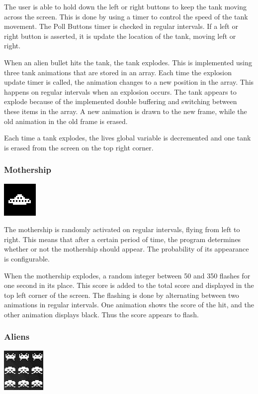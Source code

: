\documentclass[11pt,letter,oneside]{report}
\begin{document}
The user is able to hold down the left or right buttons to keep the tank moving across the screen. This is done by using a timer to control the speed of the tank movement. The Poll Buttons timer is checked in regular intervals. If a left or right button is asserted, it is update the location of the tank, moving left or right.

When an alien bullet hits the tank, the tank explodes. This is implemented using three tank animations that are stored in an array. Each time the explosion update timer is called, the animation changes to a new position in the array. This happens on regular intervals when an explosion occurs. The tank appears to explode because of the implemented double buffering and switching between these items in the array. A new animation is drawn to the new frame, while the old animation in the old frame is erased.

Each time a tank explodes, the lives global variable is decremented and one tank is erased from the screen on the top right corner.

\subsubsection{Mothership}
\includegraphics[]{big-alien.png}

The mothership is randomly activated on regular intervals, flying from left to right. This means that after a certain period of time, the program determines whether or not the mothership should appear. The probability of its appearance is configurable.

When the mothership explodes, a random integer between 50 and 350 flashes for one second in its place. This score is added to the total score and displayed in the top left corner of the screen. The flashing is done by alternating between two animations in regular intervals. One animation shows the score of the hit, and the other animation displays black. Thus the score appears to flash.

\subsubsection{Aliens}
\includegraphics[]{aliens.jpg}
\end{document}
